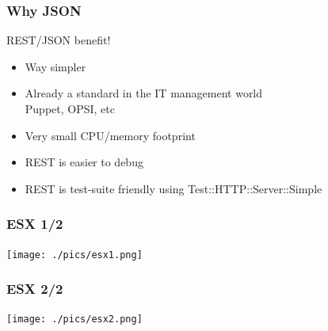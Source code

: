 \documentclass{beamer}
\begin{document}
\begin{frame}
    \frametitle{Why JSON}

    \begin{block}{REST/JSON benefit!}
        \begin{itemize}
            \item Way simpler
            \item Already a standard in the IT management world \\
            \small{Puppet, OPSI, etc}
            \item Very small CPU/memory footprint
            \item REST is easier to debug
            \item REST is test-suite friendly using Test::HTTP::Server::Simple
        \end{itemize}
    \end{block}

\end{frame}
%
%
%
%


\begin{frame}
\frametitle{ESX 1/2}


   \texttt{[image: ./pics/esx1.png]}
\end{frame}
%
\begin{frame}
\frametitle{ESX 2/2}


   \texttt{[image: ./pics/esx2.png]}
\end{frame}
\end{document}
